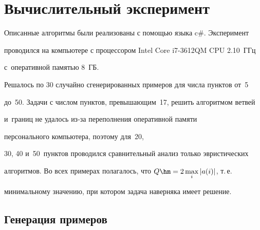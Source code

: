   


\vspace*{-4pt}


  


\section{Вычислительный эксперимент}





\vspace*{-2pt}





  Описанные алгоритмы были реализованы с помощью языка c\#. Эксперимент 


проводился на компьютере с процессором Intel Core i7-3612QM CPU 2.10~ГГц 


с~оперативной памятью 8~ГБ. 


  


  Решалось по 30 случайно сгенерированных примеров для числа пунктов от~5 


до~50. Задачи с числом пунктов, превышающим~17, решить алгоритмом ветвей 


и~границ не удалось из-за переполнения оперативной памяти


персонального компьютера, поэтому для~20, 


30, 40 и~50~пунктов проводился сравнительный анализ только эвристических 


алгоритмов. Во всех примерах полагалось, что $Q\hm= 2\max\limits_i |a(i)|$, т.\,е.\ 


минимальному значению, при котором задача наверняка имеет решение.





\vspace*{-4pt}


    


\subsection{Генерация примеров}





\vspace*{-2pt}





